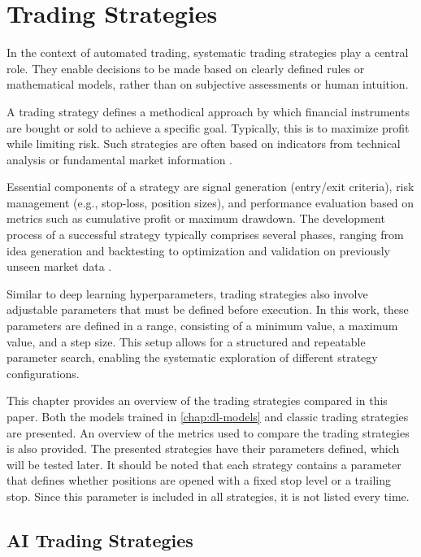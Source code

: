
\section{Trading Strategies}
\label{chap:trading-strategies}

In the context of automated trading, systematic trading strategies play a central role.
They enable decisions to be made based on clearly defined rules or mathematical models, rather than on subjective assessments or human intuition.

A trading strategy defines a methodical approach by which financial instruments are bought or sold to achieve a specific goal.
Typically, this is to maximize profit while limiting risk.
Such strategies are often based on indicators from technical analysis or fundamental market information \cite{investopia-trading-strategy}.

Essential components of a strategy are signal generation (entry/exit criteria), risk management (e.g., stop-loss, position sizes), and performance evaluation based on metrics such as cumulative profit or maximum drawdown.
The development process of a successful strategy typically comprises several phases, ranging from idea generation and backtesting to optimization and validation on previously unseen market data \cite{investopia-trading-strategy-components}.

Similar to deep learning hyperparameters, trading strategies also involve adjustable parameters that must be defined before execution.
In this work, these parameters are defined in a range, consisting of a minimum value, a maximum value, and a step size.
This setup allows for a structured and repeatable parameter search, enabling the systematic exploration of different strategy configurations.

This chapter provides an overview of the trading strategies compared in this paper.
Both the models trained in \autoref{chap:dl-models} and classic trading strategies are presented.
An overview of the metrics used to compare the trading strategies is also provided.
The presented strategies have their parameters defined, which will be tested later.
It should be noted that each strategy contains a parameter that defines whether positions are opened with a fixed stop level or a trailing stop.
Since this parameter is included in all strategies, it is not listed every time.

\subsection{AI Trading Strategies}
\label{chap:ai-strategies}

